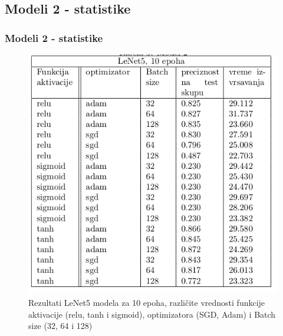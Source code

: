 \documentclass{beamer}
\begin{document}
\subsection{Modeli 2 - statistike}
\begin{frame}
\frametitle{Modeli 2 - statistike}

\begin{figure}
\includegraphics[scale=0.30]{stat_model2_10.png}
\caption{Rezultati LeNet5 modela za 10 epoha, različite vrednosti funkcije aktivacije (relu, tanh i sigmoid), optimizatora (SGD, Adam) i Batch size (32, 64 i 128)}
\end{figure}


\end{frame}

\end{document}

